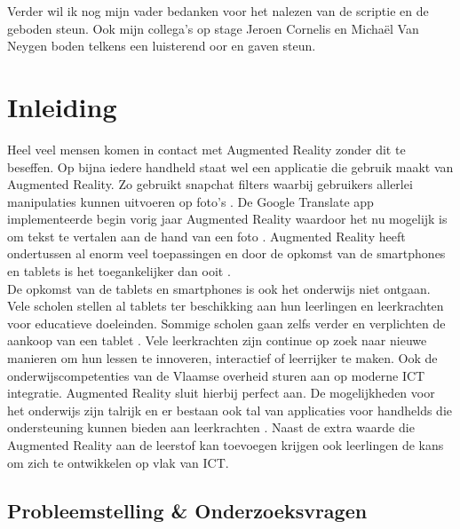 \documentclass[pdftex,a4paper,12pt,twoside]{report}
\begin{document}
Verder wil ik nog mijn vader bedanken voor het nalezen van de scriptie en de geboden steun. Ook mijn collega's op stage Jeroen Cornelis en Micha\"el Van Neygen boden telkens een luisterend oor en gaven steun.

\tableofcontents



\chapter{Inleiding}
\label{ch:inleiding}

Heel veel mensen komen in contact met Augmented Reality zonder dit te beseffen. Op bijna iedere handheld staat wel een applicatie die gebruik maakt van Augmented Reality. Zo gebruikt snapchat filters waarbij gebruikers allerlei manipulaties kunnen uitvoeren op foto's \citep{Snapchat}. De Google Translate app implementeerde begin vorig jaar Augmented Reality waardoor het nu mogelijk is om tekst te vertalen aan de hand van een foto \citep{GoogleTrans}. Augmented Reality heeft ondertussen al enorm veel toepassingen en door de opkomst van de smartphones en tablets is het toegankelijker dan ooit  \citep{tablets}.\\

De opkomst van de tablets en smartphones is ook het onderwijs niet ontgaan. Vele scholen stellen al tablets ter beschikking aan hun leerlingen en leerkrachten voor educatieve doeleinden. Sommige scholen gaan zelfs verder en verplichten de aankoop van een tablet \citep{ipadschool}. Vele leerkrachten zijn continue op zoek naar nieuwe manieren om hun lessen te innoveren, interactief of leerrijker te maken. Ook de onderwijscompetenties van de Vlaamse overheid sturen aan op moderne ICT integratie.  Augmented Reality sluit hierbij perfect aan. De mogelijkheden voor het onderwijs zijn talrijk en er bestaan ook tal van applicaties voor handhelds die ondersteuning kunnen bieden aan leerkrachten \citep{eduapps}. Naast de extra waarde die Augmented Reality aan de leerstof kan toevoegen krijgen ook leerlingen de kans om zich te ontwikkelen op vlak van ICT. 




\section{Probleemstelling \& Onderzoeksvragen}
\label{sec:onderzoeksvragen}
\end{document}
